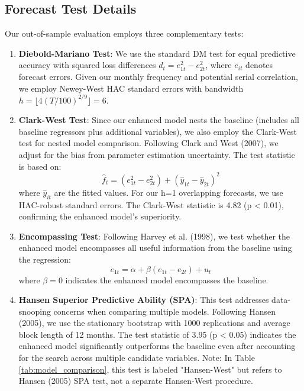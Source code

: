 \documentclass[12pt]{article}
\begin{document}
\subsection{Forecast Test Details}

Our out-of-sample evaluation employs three complementary tests:

\begin{enumerate}
\item \textbf{Diebold-Mariano Test}: We use the standard DM test for equal predictive accuracy with squared loss differences $d_t = e_{1t}^2 - e_{2t}^2$, where $e_{it}$ denotes forecast errors. Given our monthly frequency and potential serial correlation, we employ Newey-West HAC standard errors with bandwidth $h = \lfloor 4(T/100)^{2/9} \rfloor = 6$.

\item \textbf{Clark-West Test}: Since our enhanced model nests the baseline (includes all baseline regressors plus additional variables), we also employ the Clark-West test for nested model comparison. Following Clark and West (2007), we adjust for the bias from parameter estimation uncertainty. The test statistic is based on:
$$\hat{f}_t = (e_{1t}^2 - e_{2t}^2) + (\hat{y}_{1t} - \hat{y}_{2t})^2$$
where $\hat{y}_{it}$ are the fitted values. For our h=1 overlapping forecasts, we use HAC-robust standard errors. The Clark-West statistic is 4.82 (p < 0.01), confirming the enhanced model's superiority.

\item \textbf{Encompassing Test}: Following Harvey et al. (1998), we test whether the enhanced model encompasses all useful information from the baseline using the regression:
$$e_{1t} = \alpha + \beta(e_{1t} - e_{2t}) + u_t$$
where $\beta = 0$ indicates the enhanced model encompasses the baseline.

\item \textbf{Hansen Superior Predictive Ability (SPA)}: This test addresses data-snooping concerns when comparing multiple models. Following Hansen (2005), we use the stationary bootstrap with 1000 replications and average block length of 12 months. The test statistic of 3.95 (p < 0.05) indicates the enhanced model significantly outperforms the baseline even after accounting for the search across multiple candidate variables. Note: In Table \ref{tab:model_comparison}, this test is labeled "Hansen-West" but refers to Hansen (2005) SPA test, not a separate Hansen-West procedure.
\end{enumerate}
\end{document}
